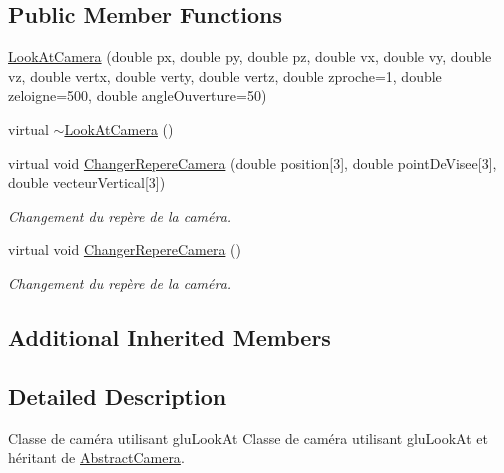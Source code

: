 \subsection*{Public Member Functions}
\begin{DoxyCompactItemize}
\item 
\hyperlink{class_look_at_camera_a14d523ff4ea3cc37abf726e2ffd981ec}{Look\+At\+Camera} (double px, double py, double pz, double vx, double vy, double vz, double vertx, double verty, double vertz, double zproche=1, double zeloigne=500, double angle\+Ouverture=50)
\item 
virtual \hyperlink{class_look_at_camera_a88d62e1f68d1ccf9dd3a80fd951e3632}{$\sim$\+Look\+At\+Camera} ()
\item 
virtual void \hyperlink{class_look_at_camera_a0904e7cb4cc17c9d8dd54d8a394eb9cc}{Changer\+Repere\+Camera} (double position\mbox{[}3\mbox{]}, double point\+De\+Visee\mbox{[}3\mbox{]}, double vecteur\+Vertical\mbox{[}3\mbox{]})
\begin{DoxyCompactList}\small\item\em Changement du repère de la caméra. \end{DoxyCompactList}\item 
virtual void \hyperlink{class_look_at_camera_ac8ff2cf45773bf8f27fa9972e1f48c5d}{Changer\+Repere\+Camera} ()
\begin{DoxyCompactList}\small\item\em Changement du repère de la caméra. \end{DoxyCompactList}\end{DoxyCompactItemize}
\subsection*{Additional Inherited Members}


\subsection{Detailed Description}
Classe de caméra utilisant glu\+Look\+At Classe de caméra utilisant glu\+Look\+At et héritant de \hyperlink{class_abstract_camera}{Abstract\+Camera}. 

